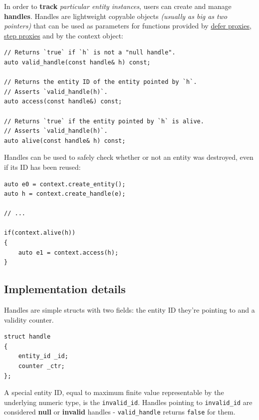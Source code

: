 \documentclass[twoside, 12pt, a4paper, openany]{book}
\begin{document}
In order to \textbf{track} \emph{particular entity instances}, users can
create and manage \textbf{handles}. Handles are lightweight copyable
objects \emph{(usually as big as two pointers)} that can be used as
parameters for functions provided by
\protect\hyperlink{proxies_defer}{defer proxies},
\protect\hyperlink{proxies_step}{step proxies} and by the context
object:

\begin{verbatim}
// Returns `true` if `h` is not a "null handle".
auto valid_handle(const handle& h) const;

// Returns the entity ID of the entity pointed by `h`.
// Asserts `valid_handle(h)`.
auto access(const handle&) const;

// Returns `true` if the entity pointed by `h` is alive.
// Asserts `valid_handle(h)`.
auto alive(const handle& h) const;
\end{verbatim}

Handles can be used to safely check whether or not an entity was
destroyed, even if its ID has been reused:

\begin{verbatim}
auto e0 = context.create_entity();
auto h = context.create_handle(e);

// ...

if(context.alive(h))
{
    auto e1 = context.access(h);
}
\end{verbatim}

\subsection{Implementation details}\label{implementation-details-3}

Handles are simple structs with two fields: the entity ID they're
pointing to and a validity counter.

\begin{verbatim}
struct handle
{
    entity_id _id;
    counter _ctr;
};
\end{verbatim}

A special entity ID, equal to maximum finite value representable by the
underlying numeric type, is the
\texttt{invalid_id}.
Handles pointing to
\texttt{invalid_id}
are considered \textbf{null} or \textbf{invalid} handles -
\texttt{valid_handle}
returns
\texttt{false}
for them.
\end{document}
